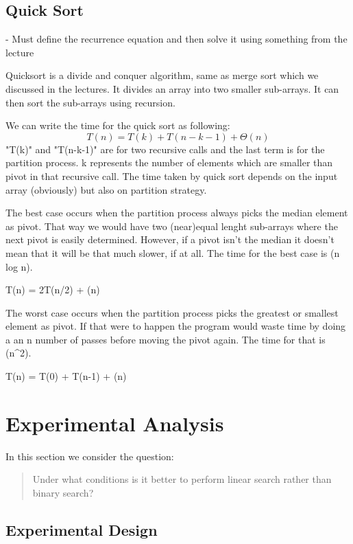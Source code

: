 \documentclass{article}
\begin{document}
\subsection{Quick Sort}

- Must define the recurrence equation and then solve it using something from the lecture

Quicksort is a divide and conquer algorithm, same as merge sort which we discussed in the lectures. It divides an array into two smaller sub-arrays. It can then sort the sub-arrays using recursion. 

We can write the time for the quick sort as following:
\begin{equation}
T(n) = T(k) + T(n-k-1) + \Theta(n)
\end{equation}
"T(k)" and "T(n-k-1)" are for two recursive calls and the last term is for the partition process. k represents the number of elements which are smaller than pivot in that recursive call. The time taken by quick sort depends on the input array (obviously) but also on partition strategy.

The best case occurs when the partition process always picks the median element as pivot. That way we would have two (near)equal lenght sub-arrays where the next pivot is easily determined. However, if a pivot isn't the median it doesn't mean that it will be that much slower, if at all. The time for the best case is \Theta(n log n).

T(n) = 2T(n/2) + \Theta(n)

The worst case occurs when the partition process picks the greatest or smallest element as pivot. If that were to happen the program would waste time by doing a an n number of passes before moving the pivot again. The time for that is \Theta(n^2).

T(n) = T(0) + T(n-1) + \Theta(n)

\section{Experimental Analysis}
\label{sec:initialExperiments}

In this section we consider the question:
	\begin{quote}
	Under what conditions is it better to perform linear search rather than binary search?
	\end{quote}

\subsection{Experimental Design}
\end{document}
